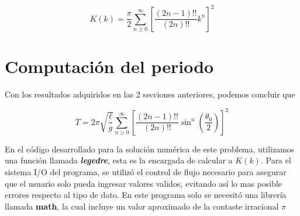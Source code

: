 \documentclass[]{article}
\begin{document}
	\begin{equation}
		K(k) = \frac{\pi}{2}\sum_{n \geq 0}^{\infty} \left[\frac{(2n-1)!!}{(2n)!!}k^n\right]^2
	\end{equation}

	\section{Computación del periodo}
	
	Con los resultados adquiridos en las 2 secciones anteriores, podemos concluir que
	
	\begin{equation}
		T = 2\pi\sqrt{\frac{\ell}{g}}\sum_{n \geq 0}^{\infty} \left[\frac{(2n-1)!!}{(2n)!!}\sin^n\left(\frac{\theta_0}{2}\right)\right]^2
	\end{equation}
	
	En el código desarrollado para la solución numérica de este problema, utilizamos una función llamada \textbf{\textit{legedre}}, esta es la encargada de calcular a $K(k)$. Para el sistema I/O del programa, se utilizó el control de flujo necesario para asegurar que el usuario solo pueda ingresar valores validos, evitando así lo mas posible errores respecto al tipo de dato. En este programa solo se necesitó una librería llamada \textbf{math}, la cual incluye un valor aproximado de la contaste irracional $\pi$
\end{document}
